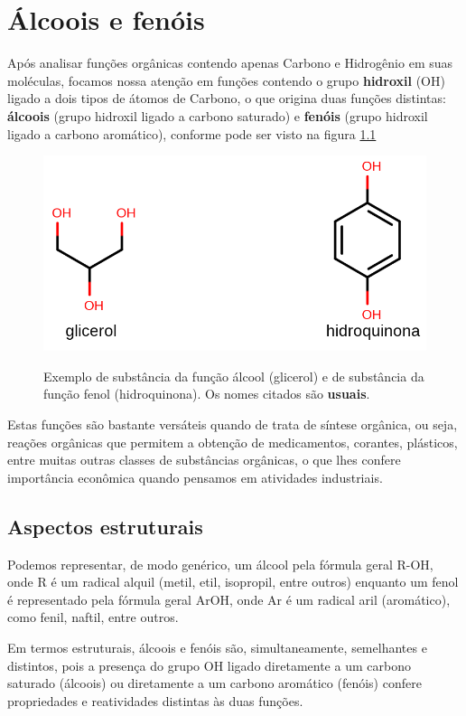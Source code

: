 \chapter{Álcoois e fenóis}
\begin{mdframed}[backgroundcolor=orange!20,linewidth=0pt,roundcorner=10pt]
	\minitoc
\end{mdframed}
Após analisar funções orgânicas contendo apenas Carbono e Hidrogênio em suas moléculas, focamos nossa atenção em funções contendo o grupo \textbf{hidroxil} (OH) ligado a dois tipos de átomos de Carbono, o que origina duas funções distintas: \textbf{álcoois} (grupo hidroxil ligado a carbono saturado) e \textbf{fenóis} (grupo hidroxil ligado a carbono aromático), conforme pode ser visto na figura \ref{fig:af}

\begin{figure}[H]
	\centering
	\caption{Exemplo de substância da função álcool (glicerol) e de substância da função fenol (hidroquinona). Os nomes citados são \textbf{usuais}.}
	\vspace{0.5cm}
	\includegraphics[width=0.7\linewidth]{imagens/af.png}
	\label{fig:af}
\end{figure}


Estas funções são bastante versáteis quando de trata de síntese orgânica, ou seja, reações orgânicas que permitem a obtenção de medicamentos, corantes, plásticos, entre muitas outras classes de substâncias orgânicas, o que lhes confere importância econômica quando pensamos em atividades industriais.

\section{Aspectos estruturais}
Podemos representar, de modo genérico, um álcool pela fórmula geral R-OH, onde R é um radical alquil (metil, etil, isopropil, entre outros) enquanto um fenol é representado pela fórmula geral ArOH, onde Ar é um radical aril (aromático), como fenil, naftil, entre outros.

Em termos estruturais, álcoois e fenóis são, simultaneamente, semelhantes e distintos, pois a presença do grupo OH ligado diretamente a um carbono saturado (álcoois) ou diretamente a um carbono aromático (fenóis) confere propriedades e reatividades distintas às duas funções.

